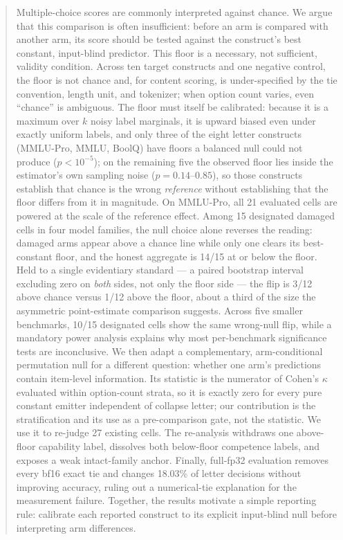 \begin{abstract}
Multiple-choice scores are commonly interpreted against chance. We argue that this comparison is often insufficient: before an arm is compared with another arm, its score should be tested against the construct's best constant, input-blind predictor. This floor is a necessary, not sufficient, validity condition. Across ten target constructs and one negative control, the floor is not chance and, for content scoring, is under-specified by the tie convention, length unit, and tokenizer; when option count varies, even ``chance'' is ambiguous. The floor must itself be calibrated: because it is a maximum over $k$ noisy label marginals, it is upward biased even under exactly uniform labels, and only three of the eight letter constructs (MMLU-Pro, MMLU, BoolQ) have floors a balanced null could not produce ($p<10^{-5}$); on the remaining five the observed floor lies inside the estimator's own sampling noise ($p=0.14$--$0.85$), so those constructs establish that chance is the wrong \emph{reference} without establishing that the floor differs from it in magnitude. On MMLU-Pro, all 21 evaluated cells are powered at the scale of the reference effect. Among 15 designated damaged cells in four model families, the null choice alone reverses the reading: damaged arms appear above a chance line while only one clears its best-constant floor, and the honest aggregate is 14/15 at or below the floor. Held to a single evidentiary standard --- a paired bootstrap interval excluding zero on \emph{both} sides, not only the floor side --- the flip is 3/12 above chance versus 1/12 above the floor, about a third of the size the asymmetric point-estimate comparison suggests. Across five smaller benchmarks, 10/15 designated cells show the same wrong-null flip, while a mandatory power analysis explains why most per-benchmark significance tests are inconclusive. We then adapt a complementary, arm-conditional permutation null for a different question: whether one arm's predictions contain item-level information. Its statistic is the numerator of Cohen's $\kappa$ evaluated within option-count strata, so it is exactly zero for every pure constant emitter independent of collapse letter; our contribution is the stratification and its use as a pre-comparison gate, not the statistic. We use it to re-judge 27 existing cells. The re-analysis withdraws one above-floor capability label, dissolves both below-floor competence labels, and exposes a weak intact-family anchor. Finally, full-fp32 evaluation removes every bf16 exact tie and changes 18.03\% of letter decisions without improving accuracy, ruling out a numerical-tie explanation for the measurement failure. Together, the results motivate a simple reporting rule: calibrate each reported construct to its explicit input-blind null before interpreting arm differences.
\end{abstract}
